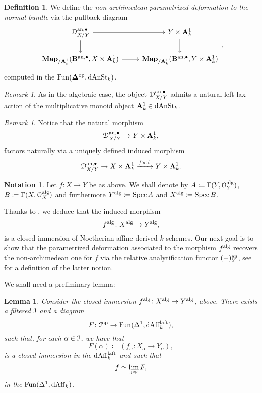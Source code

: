 \documentclass[10pt,a4paper,reqno]{amsart} %
\theoremstyle{plain}
\newtheorem{lem}[thm]{Lemma}
\theoremstyle{definition}
\newtheorem{defin}[thm]{Definition}
\newtheorem{notation}[thm]{Notation}
\theoremstyle{remark}
\newtheorem{rem}[thm]{Remark}
\numberwithin{equation}{section}
\begin{document}
\begin{defin}
    We define the \emph{non-archimedean parametrized deformation to the normal bundle} via the pullback diagram
    \[
    \begin{tikzcd}
        \cD_{X/Y}^{\mathrm{an}, \bullet} \ar{r} \ar{d} & Y \times \bA^1_k \ar{d} \\
        \bfMap_{/ \bA^1_k}(\mathbf{B}^{\mathrm{an}, \bullet}, X \times \bA^1_k) \ar{r} & \bfMap_{/ \bA^1_k}(\mathbf{B}^{\mathrm{an, \bullet}}, Y \times \bA^1_k)
    \end{tikzcd},
    \]
    computed in the \infcat $\mathrm{Fun}(\bm{\Delta} ^\mathrm{op}, \mathrm{dAnSt}_k)$.
\end{defin}

\begin{rem}
    As in the algebraic case, the object $\mathcal D_{X/ Y}^{\mathrm{an}, \bullet}$ admits a natural left-lax action of the multiplicative monoid object $\mathbf A^1_k \in \mathrm{dAnSt}_k$.
\end{rem}

\begin{rem} \label{rem:factorizations}
    Notice that the natural morphism
        \[
            \mathcal D_{X/ Y}^{\mathrm{an}, \bullet} \to Y \times \mathbf A^1_k,   
        \]
    factors naturally via a uniquely defined induced morphism
        \[\mathcal D_{X/ Y}^{\mathrm{an}, \bullet} \to X \times \mathbf A^1_k \xrightarrow{f \times \mathrm{id}} Y \times \mathbf A^1_k.\] 
\end{rem}

\begin{notation} Let $f \colon X \to Y$ be as above.
    We shall denote by $A \coloneqq \Gamma(Y, \mathcal O_Y^\mathrm{alg})$, $B \coloneqq \Gamma(X, \mathcal O_X^\mathrm{alg})$ and
    furthermore $Y^\mathrm{alg} \coloneqq \operatorname{Spec} A$ and $X^\mathrm{alg} \coloneqq \operatorname{Spec} B$.
\end{notation}

Thanks to \cite[Proposition 3.14]{Porta_Yu_Derived_non-archimedean_analytic_spaces}, we deduce that the induced morphism
    \[
        f^\mathrm{alg} \colon X^\mathrm{alg} \to Y^\mathrm{alg},  
    \]
is a closed immersion
of Noetherian affine derived $k$-schemes. Our next goal is to show that the parametrized deformation associated to the morphism
$f^\mathrm{alg}$ recovers the non-archimedean one for $f$ via the relative analytification functor $(-)^\mathrm{an}_Y$, see \cite[Definition 6.4.]{Porta_Yu_NQK}
for a definition of the latter notion.

We shall need a preliminary lemma:


\begin{lem}
    Consider the closed immersion $f^\mathrm{alg} \colon X^\mathrm{alg} \to Y^\mathrm{alg}$, above. There exists a filtered \infcat $\mathcal I$ and a diagram
        \[
            F \colon \mathcal I ^\mathrm{op} \to \operatorname{Fun}(\Delta^1, \mathrm{dAff}^{\mathrm{laft}}_k),  
        \]
    such that, for each $\alpha \in \mathcal I$, we have that
        \[
            F(\alpha) \coloneqq (f_\alpha \colon X_\alpha \to Y_\alpha),  
        \]
    is a closed immersion in the \infcat $\mathrm{dAff}_k^{\mathrm{laft}}$ and such that
        \[
            f \simeq \lim_{\mathcal I^\mathrm{op}} F,  
        \]
    in the \infcat $\operatorname{Fun}(\Delta^1, \mathrm{dAff}_k)$.
\end{lem}
\end{document}
